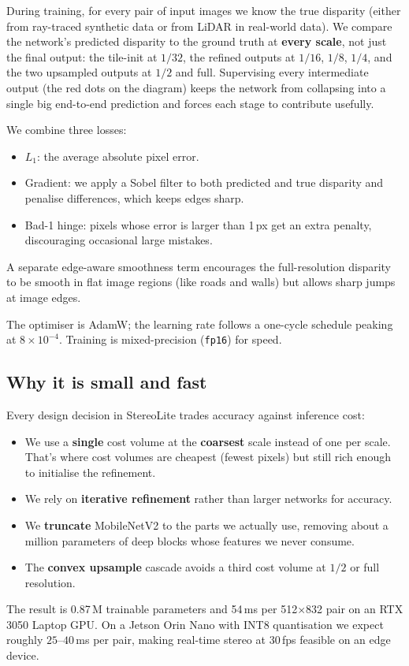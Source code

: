 \documentclass[11pt,a4paper]{article}
\begin{document}
During training, for every pair of input images we know the true
disparity (either from ray-traced synthetic data or from LiDAR in
real-world data). We compare the network's predicted disparity to the
ground truth at \textbf{every scale}, not just the final output: the
tile-init at $1/32$, the refined outputs at $1/16$, $1/8$, $1/4$, and
the two upsampled outputs at $1/2$ and full. Supervising every
intermediate output (the red dots on the diagram) keeps the network
from collapsing into a single big end-to-end prediction and forces each
stage to contribute usefully.

We combine three losses:
\begin{itemize}[leftmargin=*, topsep=1pt, itemsep=0pt]
  \item $L_1$: the average absolute pixel error.
  \item Gradient: we apply a Sobel filter to both predicted and true
    disparity and penalise differences, which keeps edges sharp.
  \item Bad-1 hinge: pixels whose error is larger than 1\,px get an
    extra penalty, discouraging occasional large mistakes.
\end{itemize}
A separate edge-aware smoothness term encourages the full-resolution
disparity to be smooth in flat image regions (like roads and walls) but
allows sharp jumps at image edges.

The optimiser is AdamW; the learning rate follows a one-cycle schedule
peaking at $8\times 10^{-4}$. Training is mixed-precision (\texttt{fp16})
for speed.

\subsection{Why it is small and fast}

Every design decision in StereoLite trades accuracy against inference
cost:
\begin{itemize}[leftmargin=*, topsep=1pt, itemsep=0pt]
  \item We use a \textbf{single} cost volume at the \textbf{coarsest}
    scale instead of one per scale. That's where cost volumes are
    cheapest (fewest pixels) but still rich enough to initialise the
    refinement.
  \item We rely on \textbf{iterative refinement} rather than larger
    networks for accuracy.
  \item We \textbf{truncate} MobileNetV2 to the parts we actually use,
    removing about a million parameters of deep blocks whose features
    we never consume.
  \item The \textbf{convex upsample} cascade avoids a third cost volume
    at $1/2$ or full resolution.
\end{itemize}
The result is 0.87\,M trainable parameters and 54\,ms per 512$\times$832
pair on an RTX 3050 Laptop GPU. On a Jetson Orin Nano with INT8
quantisation we expect roughly $25$--$40$\,ms per pair, making real-time
stereo at 30\,fps feasible on an edge device.
\end{document}
